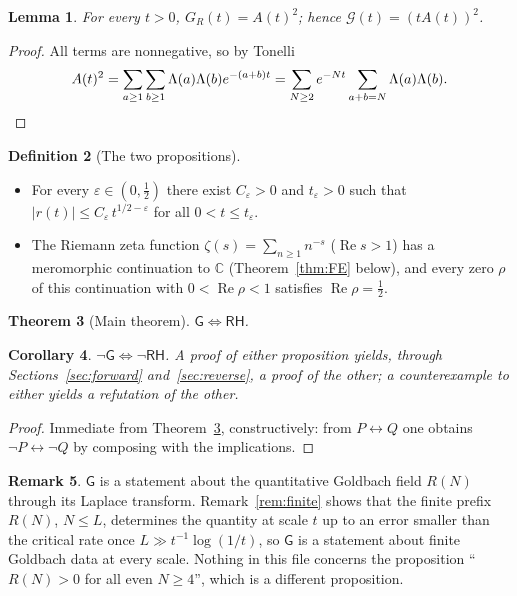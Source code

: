\documentclass[11pt]{article}
\newtheorem{theorem}{Theorem}[section]
\newtheorem{lemma}[theorem]{Lemma}
\newtheorem{corollary}[theorem]{Corollary}
\theoremstyle{definition}
\newtheorem{definition}[theorem]{Definition}
\newtheorem{remark}[theorem]{Remark}
\newcommand{\C}{\mathbb{C}}
\newcommand{\Lam}{\Lambda}
\newcommand{\re}{\operatorname{Re}}
\newcommand{\G}{\mathcal{G}}
\newcommand{\RH}{\mathsf{RH}}
\newcommand{\GR}{\mathsf{G}}
\begin{document}
\begin{lemma}\label{lem:square}
For every $t>0$, $G_R(t)=A(t)^{2}$; hence $\G(t)=(tA(t))^{2}$.
\end{lemma}
\begin{proof}
All terms are nonnegative, so by Tonelli
\[
A(t)^{2}=\sum_{a\ge1}\sum_{b\ge1}\Lam(a)\Lam(b)e^{-(a+b)t}=\sum_{N\ge2}e^{-Nt}\sum_{a+b=N}\Lam(a)\Lam(b).\qedhere
\]
\end{proof}

\begin{definition}[The two propositions]
\begin{itemize}
\item[$\GR$:] For every $\varepsilon\in(0,\tfrac12)$ there exist $C_\varepsilon>0$ and $t_\varepsilon>0$ such that
$|r(t)|\le C_\varepsilon\,t^{1/2-\varepsilon}$ for all $0<t\le t_\varepsilon$.
\item[$\RH$:] The Riemann zeta function $\zeta(s)=\sum_{n\ge1}n^{-s}$ ($\re s>1$) has a meromorphic continuation to $\C$ (Theorem~\ref{thm:FE} below), and every zero $\rho$ of this continuation with $0<\re\rho<1$ satisfies $\re\rho=\tfrac12$.
\end{itemize}
\end{definition}

\begin{theorem}[Main theorem]\label{thm:main}
$\GR\iff\RH$.
\end{theorem}

\begin{corollary}\label{cor:truth}
$\neg\GR\iff\neg\RH$.
A proof of either proposition yields, through Sections~\ref{sec:forward} and~\ref{sec:reverse}, a proof of the other; a counterexample to either yields a refutation of the other.
\end{corollary}
\begin{proof}
Immediate from Theorem~\ref{thm:main}, constructively: from $P\leftrightarrow Q$ one obtains $\neg P\leftrightarrow\neg Q$ by composing with the implications.
\end{proof}

\begin{remark}
$\GR$ is a statement about the quantitative Goldbach field $R(N)$ through its Laplace transform.
Remark~\ref{rem:finite} shows that the finite prefix $R(N)$, $N\le L$, determines the quantity at scale $t$ up to an error smaller than the critical rate once $L\gg t^{-1}\log(1/t)$, so $\GR$ is a statement about finite Goldbach data at every scale.
Nothing in this file concerns the proposition ``$R(N)>0$ for all even $N\ge 4$'', which is a different proposition.
\end{remark}
\end{document}
